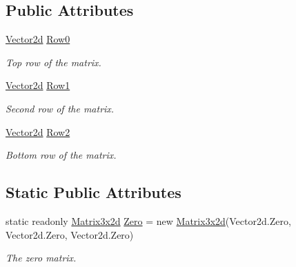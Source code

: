 \subsection*{Public Attributes}
\begin{DoxyCompactItemize}
\item 
\hyperlink{struct_open_t_k_1_1_vector2d}{Vector2d} \hyperlink{struct_open_t_k_1_1_matrix3x2d_afdcdf97888e382fb30672979cb76b7ac}{Row0}
\begin{DoxyCompactList}\small\item\em Top row of the matrix. \end{DoxyCompactList}\item 
\hyperlink{struct_open_t_k_1_1_vector2d}{Vector2d} \hyperlink{struct_open_t_k_1_1_matrix3x2d_a0362d2d628d029c63f8cd59f7fd58b19}{Row1}
\begin{DoxyCompactList}\small\item\em Second row of the matrix. \end{DoxyCompactList}\item 
\hyperlink{struct_open_t_k_1_1_vector2d}{Vector2d} \hyperlink{struct_open_t_k_1_1_matrix3x2d_a91d77d1d58b78d8452df851a9abdbb2d}{Row2}
\begin{DoxyCompactList}\small\item\em Bottom row of the matrix. \end{DoxyCompactList}\end{DoxyCompactItemize}
\subsection*{Static Public Attributes}
\begin{DoxyCompactItemize}
\item 
static readonly \hyperlink{struct_open_t_k_1_1_matrix3x2d}{Matrix3x2d} \hyperlink{struct_open_t_k_1_1_matrix3x2d_a14e999a630fa86770c5bb9cb6c4d1522}{Zero} = new \hyperlink{struct_open_t_k_1_1_matrix3x2d}{Matrix3x2d}(Vector2d.\-Zero, Vector2d.\-Zero, Vector2d.\-Zero)
\begin{DoxyCompactList}\small\item\em The zero matrix. \end{DoxyCompactList}\end{DoxyCompactItemize}
